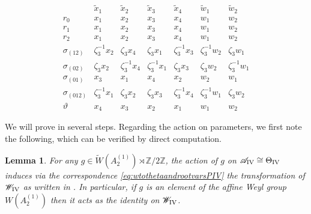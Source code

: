 \documentclass[a4paper,reqno]{amsart}
\numberwithin{equation}{section}
\newcommand{\Z}{\mathbb{Z}}
\newcommand{\pain}[1]{\operatorname{P}_{\mathrm{#1}}}
\newtheorem{lemma}[theorem]{Lemma}
\numberwithin{equation}{section}
\begin{document}
\begingroup
\setlength{\tabcolsep}{15pt} %
\renewcommand{\arraystretch}{1.5} %
\begin{table}[h]
    \begin{equation*}
    \begin{array}{c||c|c|c|c||c|c|}
              & \tilde{x}_1    & \tilde{x}_2     & \tilde{x}_3    & \tilde{x}_4   & \tilde{w}_1   & \tilde{w}_2           \\
        \hline\hline 
        r_0   &   x_1    &  x_2    &  x_3 &    x_4 & w_1   &  w_2             \\
        r_1   &   x_1    &  x_2    &  x_3 &    x_4 & w_1   &  w_2             \\
        r_2   &   x_1    &  x_2    &  x_3 &    x_4 & w_1   &  w_2             \\
        \hline\hline
        \sigma_{(12)}   &   \zeta_3^{-1} x_2    &  \zeta_3 x_4    &  \zeta_3 x_1 &   \zeta_3^{-1} x_3 & \zeta_3^{-1} w_2   & \zeta_3 w_1             \\
        \sigma_{(02)}   & \zeta_3 x_2    &  \zeta_3^{-1} x_4    &  \zeta_3^{-1} x_1 &   \zeta_3 x_3 & \zeta_3 w_2   & \zeta_3^{-1} w_1             \\
        \sigma_{(01)}   & x_3    & x_1     & x_4 & x_2 & w_2   & w_1      
        \\
        \sigma_{(012)}   &  \zeta_3^{-1} x_1  &  \zeta_3 x_2    & \zeta_3 x_3 & \zeta_3^{-1} x_4 & \zeta_3^{-1} w_1   &       \zeta_3 w_2
        \\
        \hline\hline
        \vartheta   &  x_4  &   x_3    & x_2 & x_1 &  w_1   &      w_2
    \end{array}
    \end{equation*}
    \caption{Action of symmetries of $\pain{IV}$ on $\mathcal{M}\rightarrow\mathscr{W}_{\rm{IV}}$ via conjugation by the Riemann-Hilbert map.}
    \label{tab:PIV:symmetry:dynkinautos}
\end{table}
\endgroup

We will prove  in several steps.
Regarding the action on parameters, we first note the following, which can be verified by direct computation.
\begin{lemma}\label{lem:weylactionwPIV}
    For any $g\in \widetilde{W}(A_2^{(1)})\rtimes\Z/2\Z$, the action of $g$ on $\mathscr{A}_{\rm{IV}}\cong\Theta_{\rm{IV}}$ induces via the correspondence \eqref{eq:wtothetaandrootvarsPIV} the transformation of $\mathscr{W}_{\rm{IV}}$ as written in .
    In particular, if $g$ is an element of the affine Weyl group $W(A_2^{(1)})$ then it acts as the identity on $\mathscr{W}_{\rm{IV}}$.
\end{lemma}
\end{document}
